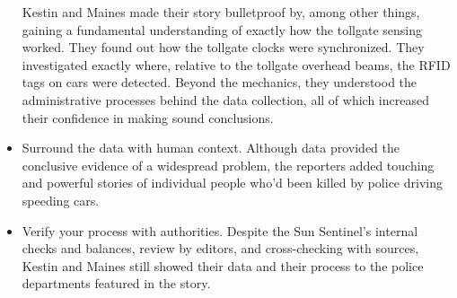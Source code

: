 \begin{itemize}
Kestin and Maines made their story bulletproof by, among other
things, gaining a fundamental understanding of exactly how the tollgate
sensing worked. They found out how the tollgate clocks were
synchronized. They investigated exactly where, relative to the tollgate
overhead beams, the RFID tags on cars were detected. Beyond
the mechanics, they understood the administrative processes behind
the data collection, all of which increased their confidence in making
sound conclusions.
\item Surround the data with human context.
Although data provided the conclusive evidence of a widespread
problem, the reporters added touching and powerful stories of individual
people who'd been killed by police driving speeding cars.
\item Verify your process with authorities.
Despite the Sun Sentinel's internal checks and balances, review by editors,
and cross-checking with sources, Kestin and Maines still showed
their data and their process to the police departments featured in
the story.
\end{itemize}

